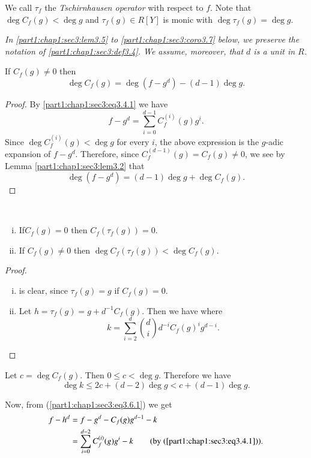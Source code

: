 We call $\tau_f$ the {\em Tschirnhausen operator} with respect to $f$. Note that $\deg C_f (g) < \deg g$ and $\tau_f (g) \in R [Y]$ is monic with $\deg \tau_f (g)= \deg g$.

{\em In \ref{part1:chap1:sec3:lem3.5} to \ref{part1:chap1:sec3:coro3.7} below, we preserve the notation of \ref{part1:chap1:sec3:def3.4}. We assume, moreover, that $d$ is a unit in $R$.}

\begin{lemma}\label{part1:chap1:sec3:lem3.5}
If $C_f (g) \neq 0$ then
$$
\deg C_f (g) = \deg (f- g^d)- (d-1) \deg g.
$$
\end{lemma}

\begin{proof}
  By \ref{part1:chap1:sec3:eq3.4.1} we have
$$
f- g^d = \sum^{d-1}_{i=0} C_f^{(i)} (g) g^i.
$$
Since $\deg C_f^{(i)}(g) < \deg g$ for every $i$, the above expression is the $g$-adic expansion of $f- g^d$. Therefore, since $C_f^{(d-1)} (g) = C_f (g) \neq 0$, we see by Lemma \ref{part1:chap1:sec3:lem3.2} that
$$
\deg (f- g^d) = (d-1) \deg g + \deg C_f (g).
$$
\end{proof}


\begin{prop}\label{part1:chap1:sec3:prop3.6}
~
\begin{enumerate}[(i)]
\item If\pageoriginale $C_f (g)=0$ then $C_f (\tau_f (g))=0$.
\item If $C_f (g) \neq 0$ then $\deg C_f (\tau_f (g)) < \deg C_f (g)$.
\end{enumerate}
\end{prop}

\begin{proof}
 ~
\begin{enumerate}[(i)]
\item is clear, since $\tau_f (g) = g$ if $C_f (g) =0$.
\item Let $h= \tau_f (g) = g + d^{-1} C_f (g)$. Then we have
where 
$$
k= \sum^d_{i=2} \binom{d}{i} d^{-i} C_f (g)^{i} g^{d-i}.
$$
\end{enumerate}
\end{proof}

Let $c= \deg C_f (g)$. Then $0 \leq c < \deg g$. Therefore we have
$$
\deg k \leq 2 c + (d-2) \deg g < c + (d-1) \deg g.
$$

Now, from (\ref{part1:chap1:sec3:eq3.6.1}) we get
\begin{align*}
  f- h^d & = f- g^d - C_f (g) g^{d-1}-k\\
  & = \sum^{d-2}_{i=0} C_f ^{(i)} (g) g^i -k \qquad (\text{by (\ref{part1:chap1:sec3:eq3.4.1})}).
\end{align*}

